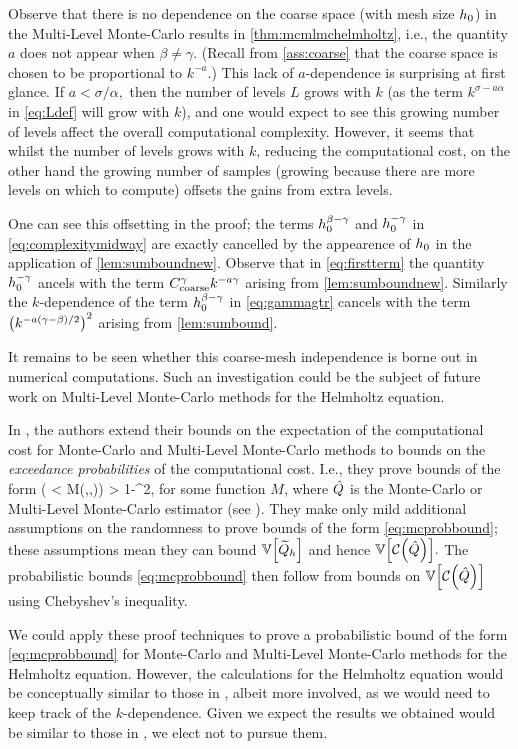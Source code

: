 Observe that there is no dependence on the coarse space (with mesh size $h_{0}$) in the Multi-Level Monte-Carlo results in \cref{thm:mcmlmchelmholtz}, i.e., the quantity $a$ does not appear when $\beta \neq \gamma$. (Recall from \cref{ass:coarse} that the coarse space is chosen to be proportional to $k^{-a}$.) This lack of $a$-dependence is surprising at first glance. If $a < \sigma/\alpha,$ then the number of levels $L$ grows with $k$ (as the term $k^{\sigma - a\alpha}$ in \cref{eq:Ldef} will grow with $k$), and one would expect to see this growing number of levels affect the overall computational complexity. However, it seems that whilst the number of levels grows with $k$, reducing the computational cost, on the other hand the growing number of samples (growing because there are more levels on which to compute) offsets the gains from extra levels.

One can see this offsetting in the proof; the terms $h_{0}^{\beta-\gamma}$ and $h_{0}^{-\gamma}$ in \cref{eq:complexitymidway} are exactly cancelled by the appearence of $h_{0}$ in the application of \cref{lem:sumboundnew}. Observe that in \cref{eq:firstterm} the quantity $h_{0}^{-\gamma}$ ancels with the term $C_{\mathrm{coarse}}^{\gamma}k^{-a\gamma}$ arising from \cref{lem:sumboundnew}. Similarly the $k$-dependence of the term $h_{0}^{\beta-\gamma}$ in \cref{eq:gammagtr} cancels with the term $\mleft(k^{-a(\gamma-\beta)/2}\mright)^2$ arising from \ref{lem:sumbound}.

It remains to be seen whether this coarse-mesh independence is borne out in numerical computations. Such an investigation could be the subject of future work on Multi-Level Monte-Carlo methods for the Helmholtz equation.
\ere

In \cite{GrPaSc:19}, the authors extend their bounds on the expectation of the computational cost for Monte-Carlo and Multi-Level Monte-Carlo methods to bounds on the \emph{exceedance probabilities} of the computational cost. I.e., they prove bounds of the form
\beq\label{eq:mcprobbound}
\PP\mleft(\Cost{\Qhat} < M(\eps,\delta,\Qhat)\mright) > 1-\delta^2,
\eeq
for some function $M$, where $\hat{Q}$ is the Monte-Carlo or Multi-Level Monte-Carlo estimator (see \cite[Theorems 5.12 and 5.13]{GrPaSc:19}). They make only mild additional assumptions on the randomness to prove bounds of the form \cref{eq:mcprobbound}; these assumptions mean they can bound $\VAR{\Qhtilde}$ and hence $\VAR{\Cost{\Qhat}}.$ The probabilistic bounds \cref{eq:mcprobbound} then follow from bounds on $\VAR{\Cost{\Qhat}}$ using Chebyshev's inequality.

We could apply these proof techniques to prove a probabilistic bound of the form \cref{eq:mcprobbound} for Monte-Carlo and Multi-Level Monte-Carlo methods for the Helmholtz equation. However, the calculations for the Helmholtz equation would be conceptually similar to those in \cite{GrPaSc:19}, albeit more involved, as we would need to keep track of the $k$-dependence. Given we expect the results we obtained would be similar to those in \cite{GrPaSc:19}, we elect not to pursue them.
\ere
{}
